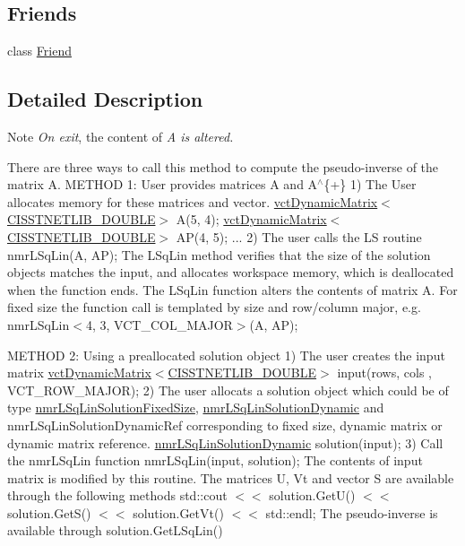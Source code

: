 \subsection*{Friends}
\begin{DoxyCompactItemize}
\item 
class \hyperlink{classnmr_l_sq_lin_solution_dynamic_a7f8321d57e81bc613d5dbef3410ba70e}{Friend}
\end{DoxyCompactItemize}


\subsection{Detailed Description}
\begin{DoxyNote}{Note}
{\itshape On exit}, the content of {\itshape A is altered.}
\end{DoxyNote}
There are three ways to call this method to compute the pseudo-\/inverse of the matrix A. M\+E\+T\+H\+O\+D 1\+: User provides matrices A and A$^\wedge$\{+\} 1) The User allocates memory for these matrices and vector. \hyperlink{classvct_dynamic_matrix}{vct\+Dynamic\+Matrix$<$\+C\+I\+S\+S\+T\+N\+E\+T\+L\+I\+B\+\_\+\+D\+O\+U\+B\+L\+E$>$} A(5, 4); \hyperlink{classvct_dynamic_matrix}{vct\+Dynamic\+Matrix$<$\+C\+I\+S\+S\+T\+N\+E\+T\+L\+I\+B\+\_\+\+D\+O\+U\+B\+L\+E$>$} A\+P(4, 5); ... 2) The user calls the L\+S routine nmr\+L\+Sq\+Lin(\+A, A\+P); The L\+Sq\+Lin method verifies that the size of the solution objects matches the input, and allocates workspace memory, which is deallocated when the function ends. The L\+Sq\+Lin function alters the contents of matrix A. For fixed size the function call is templated by size and row/column major, e.\+g. nmr\+L\+Sq\+Lin$<$4, 3, V\+C\+T\+\_\+\+C\+O\+L\+\_\+\+M\+A\+J\+O\+R$>$(\+A, A\+P);

M\+E\+T\+H\+O\+D 2\+: Using a preallocated solution object 1) The user creates the input matrix \hyperlink{classvct_dynamic_matrix}{vct\+Dynamic\+Matrix$<$\+C\+I\+S\+S\+T\+N\+E\+T\+L\+I\+B\+\_\+\+D\+O\+U\+B\+L\+E$>$} input(rows, cols , V\+C\+T\+\_\+\+R\+O\+W\+\_\+\+M\+A\+J\+O\+R); 2) The user allocats a solution object which could be of type \hyperlink{classnmr_l_sq_lin_solution_fixed_size}{nmr\+L\+Sq\+Lin\+Solution\+Fixed\+Size}, \hyperlink{classnmr_l_sq_lin_solution_dynamic}{nmr\+L\+Sq\+Lin\+Solution\+Dynamic} and nmr\+L\+Sq\+Lin\+Solution\+Dynamic\+Ref corresponding to fixed size, dynamic matrix or dynamic matrix reference. \hyperlink{classnmr_l_sq_lin_solution_dynamic}{nmr\+L\+Sq\+Lin\+Solution\+Dynamic} solution(input); 3) Call the nmr\+L\+Sq\+Lin function nmr\+L\+Sq\+Lin(input, solution); The contents of input matrix is modified by this routine. The matrices U, Vt and vector S are available through the following methods std\+::cout $<$$<$ solution.\+Get\+U() $<$$<$ solution.\+Get\+S() $<$$<$ solution.\+Get\+Vt() $<$$<$ std\+::endl; The pseudo-\/inverse is available through solution.\+Get\+L\+Sq\+Lin()

